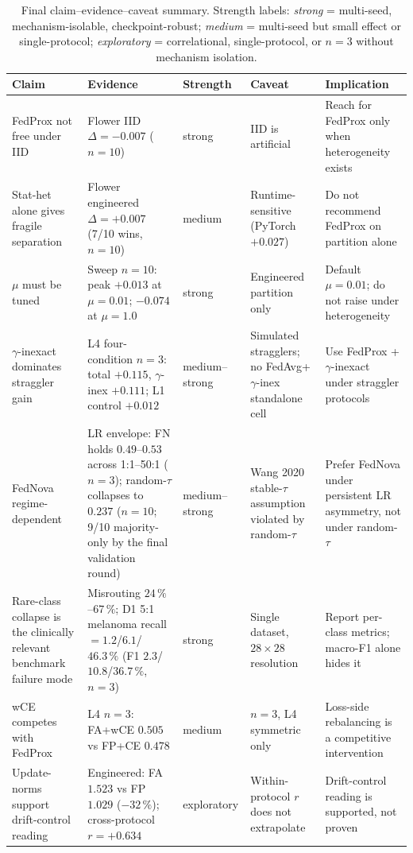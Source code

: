 \documentclass[11pt,a4paper]{report}
\begin{document}
\begin{table}[H]
\centering
\small
\caption[Final claim--evidence--caveat summary]{Final claim--evidence--caveat summary. Strength labels: \emph{strong}
= multi-seed, mechanism-isolable, checkpoint-robust; \emph{medium} =
multi-seed but small effect or single-protocol; \emph{exploratory} =
correlational, single-protocol, or $n=3$ without mechanism isolation.}
\label{tab:final-claims}
\begin{tabular}{p{3.0cm}p{3.6cm}p{1.6cm}p{2.6cm}p{2.6cm}}
\toprule
Claim & Evidence & Strength & Caveat & Implication \\
\midrule
FedProx not free under IID & Flower IID $\Delta = -0.007$ ($n=10$) & strong & IID is artificial & Reach for FedProx only when heterogeneity exists \\
Stat-het alone gives fragile separation & Flower engineered $\Delta = +0.007$ (7/10 wins, $n=10$) & medium & Runtime-sensitive (PyTorch $+0.027$) & Do not recommend FedProx on partition alone \\
$\mu$ must be tuned & Sweep $n=10$: peak $+0.013$ at $\mu = 0.01$; $-0.074$ at $\mu = 1.0$ & strong & Engineered partition only & Default $\mu = 0.01$; do not raise under heterogeneity \\
$\gamma$-inexact dominates straggler gain & L4 four-condition $n=3$: total $+0.115$, $\gamma$-inex $+0.111$; L1 control $+0.012$ & medium--strong & Simulated stragglers; no FedAvg+$\gamma$-inex standalone cell & Use FedProx + $\gamma$-inexact under straggler protocols \\
FedNova regime-dependent & LR envelope: FN holds $0.49$--$0.53$ across 1:1--50:1 ($n=3$); random-$\tau$ collapses to $0.237$ ($n=10$; 9/10 majority-only by the final validation round) & medium--strong & Wang 2020 stable-$\tau$ assumption violated by random-$\tau$ & Prefer FedNova under persistent LR asymmetry, not under random-$\tau$ \\
Rare-class collapse is the clinically relevant benchmark failure mode & Misrouting $24\,\%$--$67\,\%$; D1 5:1 melanoma recall $= 1.2$/$6.1$/$46.3\,\%$ (F1 $2.3$/$10.8$/$36.7\,\%$, $n=3$) & strong & Single dataset, $28 \times 28$ resolution & Report per-class metrics; macro-F1 alone hides it \\
wCE competes with FedProx & L4 $n=3$: FA+wCE $0.505$ vs FP+CE $0.478$ & medium & $n=3$, L4 symmetric only & Loss-side rebalancing is a competitive intervention \\
Update-norms support drift-control reading & Engineered: FA $1.523$ vs FP $1.029$ ($-32\,\%$); cross-protocol $r = +0.634$ & exploratory & Within-protocol $r$ does not extrapolate & Drift-control reading is supported, not proven \\
\bottomrule
\end{tabular}
\end{table}
\end{document}
